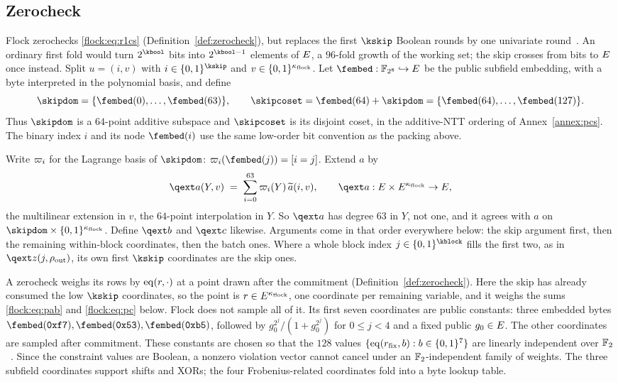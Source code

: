 \subsection{Zerocheck}\label{flock:zerocheck}

Flock zerochecks \eqref{flock:eq:r1cs} (Definition~\ref{def:zerocheck}), but replaces the first $\kskip$ Boolean rounds by one univariate round~\cite{Gru24}. An ordinary first fold would turn $2^{\kbool}$ bits into $2^{\kbool-1}$ elements of $E$, a $96$-fold growth of the working set; the skip crosses from bits to $E$ once instead. Split $u=(i,v)$ with $i\in\cube{\kskip}$ and $v\in\{0,1\}^{\kappa_{\mathrm{flock}}}$. Let $\fembed:\F_{2^8}\hookrightarrow\E$ be the public subfield embedding, with a byte interpreted in the polynomial basis, and define
\[
\skipdom=\{\fembed(0),\ldots,\fembed(63)\},\qquad \skipcoset=\fembed(64)+\skipdom=\{\fembed(64),\ldots,\fembed(127)\}.
\]
Thus $\skipdom$ is a $64$-point additive subspace and $\skipcoset$ is its disjoint coset, in the additive-NTT ordering of Annex~\ref{annex:pcs}. The binary index $i$ and its node $\fembed(i)$ use the same low-order bit convention as the packing above.

Write $\varpi_i$ for the Lagrange basis of $\skipdom$: $\lag_i(\fembed(j))=[i=j]$. Extend $a$ by
\[
  \qext a(Y,v)\;=\;\sum_{i=0}^{63}\lag_i(Y)\,\mle a(i,v),\qquad \qext a:\E\times\E^{\nflock}\to\E,
\]
the multilinear extension in $v$, the $64$-point interpolation in $Y$. So $\qext a$ has degree $63$ in $Y$, not one, and it agrees with $a$ on $\skipdom\times\cube{\nflock}$. Define $\qext b$ and $\qext c$ likewise. Arguments come in that order everywhere below: the skip argument first, then the remaining within-block coordinates, then the batch ones. Where a whole block index $j\in\cube{\kblock}$ fills the first two, as in $\qext z(j,\rho_{\mathrm{out}})$, its own first $\kskip$ coordinates are the skip ones.

A zerocheck weighs its rows by $\operatorname{eq}(r,\cdot)$ at a point drawn after the commitment (Definition~\ref{def:zerocheck}). Here the skip has already consumed the low $\kskip$ coordinates, so the point is $r\in E^{\kappa_{\mathrm{flock}}}$, one coordinate per remaining variable, and it weighs the sums \eqref{flock:eq:pab} and \eqref{flock:eq:pc} below. Flock does not sample all of it. Its first seven coordinates are public constants: three embedded bytes $\fembed(\mathtt{0xf7}),\fembed(\mathtt{0x53}),\fembed(\mathtt{0xb5})$, followed by $g_0^{2^j}/(1+g_0^{2^j})$ for $0\leq j<4$ and a fixed public $g_0\in E$. The other coordinates are sampled after commitment. These constants are chosen so that the $128$ values $\{\operatorname{eq}(r_{\mathrm{fix}},b):b\in\{0,1\}^{7}\}$ are linearly independent over $\mathbb{F}_2$~\cite{DT24,Flock26}. Since the constraint values are Boolean, a nonzero violation vector cannot cancel under an $\mathbb{F}_2$-independent family of weights. The three subfield coordinates support shifts and XORs; the four Frobenius-related coordinates fold into a byte lookup table.

